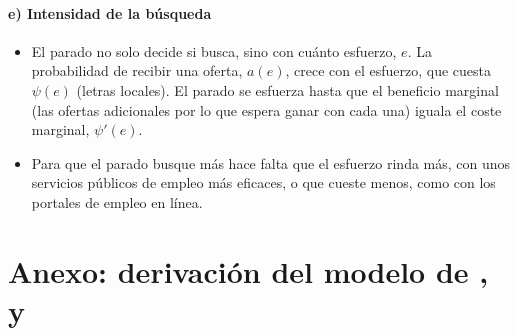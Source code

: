 \documentclass[11pt]{article}
\begin{document}
\paragraph{e) Intensidad de la búsqueda}

\begin{itemize}
\item El parado no solo decide si busca, sino con cuánto esfuerzo, $e$. La probabilidad de recibir una oferta, $a(e)$, crece con el esfuerzo, que cuesta $\psi(e)$ (letras locales). El parado se esfuerza hasta que el beneficio marginal (las ofertas adicionales por lo que espera ganar con cada una) iguala el coste marginal, $\psi'(e)$.
\item Para que el parado busque más hace falta que el esfuerzo rinda más, con unos servicios públicos de empleo más eficaces, o que cueste menos, como con los portales de empleo en línea.
\end{itemize}


\section{Anexo:\cortetitulo{} derivación del modelo de ,  y }\label{anexo:dmp-derivacion}
\end{document}
